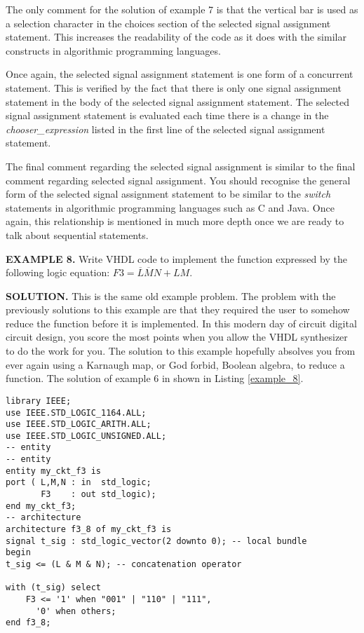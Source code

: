 The only comment for the solution of example 7 is that the vertical bar is used as a selection character in the choices section of the selected signal assignment statement. This increases the readability of the code as it does with the similar constructs in algorithmic programming languages.

Once again, the selected signal assignment statement is one form of a concurrent statement. This is verified by the fact that there is only one signal assignment statement in the body of the selected signal assignment statement. The selected signal assignment statement is evaluated each time there is a change in the \textit{chooser\_expression} listed in the first line of the selected signal assignment statement.

The final comment regarding the selected signal assignment is similar to the final comment regarding selected signal assignment. You should recognise the general form of the selected signal assignment statement to be similar to the \textit{switch} statements in algorithmic programming languages such as C and Java. Once again, this relationship is mentioned in much more depth once we are ready to talk about sequential statements.

\begin{leftbar}
\noindent
\textbf{EXAMPLE 8.}
Write VHDL code to implement the function expressed by the following logic equation: $F3=\overline{L}\overline{M}N+LM$.
\end{leftbar}
\noindent
\textbf{SOLUTION.} This is the same old example problem. The problem with the previously solutions to this example are that they required the user to somehow reduce the function before it is implemented. In this
modern day of circuit digital circuit design, you score the most points when you allow the VHDL synthesizer to do the work for you. The solution to this example hopefully absolves you from ever again using a Karnaugh map, or God forbid, Boolean algebra, to reduce a function. The solution of example 6 in shown in Listing \ref{example_8}.

\begin{lstlisting}[label=example_8, caption=Solution of example 8.]
library IEEE;
use IEEE.STD_LOGIC_1164.ALL;
use IEEE.STD_LOGIC_ARITH.ALL;
use IEEE.STD_LOGIC_UNSIGNED.ALL;
-- entity
-- entity
entity my_ckt_f3 is
port ( L,M,N : in  std_logic;
       F3    : out std_logic);
end my_ckt_f3;
-- architecture
architecture f3_8 of my_ckt_f3 is
signal t_sig : std_logic_vector(2 downto 0); -- local bundle
begin
t_sig <= (L & M & N); -- concatenation operator

with (t_sig) select
    F3 <= '1' when "001" | "110" | "111",
	  '0' when others;
end f3_8;
\end{lstlisting}


